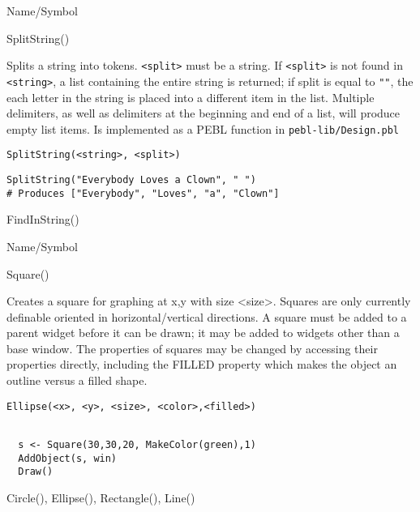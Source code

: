 \begin{desc}{Name/Symbol}
\item[Name/Symbol]  	SplitString()

\item[Description]	Splits a string into tokens. \verb+<split>+ must be a string. If 
		\verb+<split>+ is not found in \verb+<string>+, a list containing the entire 
		string is returned; if split is equal to \verb+""+, the each letter 
		in the string is placed into a different item in the list.  
		Multiple delimiters, as well as delimiters at the beginning 
		and end of a list, will produce empty list items. 
		Is implemented as a PEBL function in \texttt{pebl-lib/Design.pbl}

\item[Usage]
\begin{verbatim}
SplitString(<string>, <split>)
\end{verbatim}

\item[Example]      	
\begin{verbatim}
SplitString("Everybody Loves a Clown", " ") 
# Produces ["Everybody", "Loves", "a", "Clown"]
\end{verbatim}

\item[See Also]     	FindInString()
\end{desc}

\rl




\begin{desc}{Name/Symbol}
\item[Name/Symbol]	Square()
  
\item[Description]	Creates a square for graphing at x,y with size
  <size>. Squares are only currently definable oriented in
  horizontal/vertical directions.  A square  must be added
  to a parent widget before it can be drawn; it may be added to
  widgets other than a base window.  The properties of squares may be
  changed by accessing their properties directly, including the FILLED
  property which makes the object an outline versus a filled shape.

\item[Usage]
\begin{verbatim}
Ellipse(<x>, <y>, <size>, <color>,<filled>)
\end{verbatim}

\item[Example]	
\begin{verbatim}
  
  s <- Square(30,30,20, MakeColor(green),1)
  AddObject(s, win)
  Draw()

\end{verbatim}
\item[See Also]	 Circle(), Ellipse(), Rectangle(), Line()
\end{desc}


